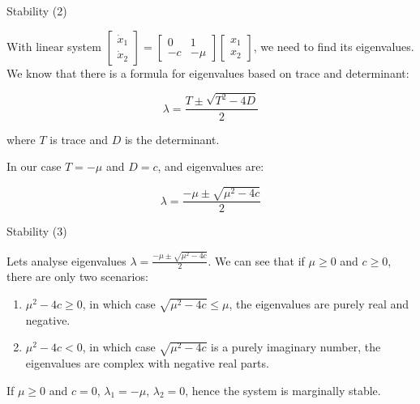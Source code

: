 \documentclass{beamer}
\begin{document}
\begin{frame}{Stability (2)}
\begin{flushleft}

With linear system 
$
    \begin{bmatrix}
    \dot x_1 \\ \dot x_2
    \end{bmatrix}
    =
    \begin{bmatrix}
    0 & 1 \\
    -c & -\mu
    \end{bmatrix} 
    \begin{bmatrix}
    x_1 \\ x_2
    \end{bmatrix}   
$, we need to find its eigenvalues. We know that there is a formula for eigenvalues based on trace and determinant:

\begin{equation}
    \lambda = \frac{T \pm \sqrt{T^2 - 4D} }{2}
\end{equation}

where $T$ is trace and $D$ is the determinant.

\bigskip

In our case $T = -\mu$ and $D = c$, and eigenvalues are:

\begin{equation}
    \lambda = \frac{-\mu \pm \sqrt{\mu^2 - 4c} }{2}
\end{equation}


\end{flushleft}
\end{frame}



\begin{frame}{Stability (3)}
\begin{flushleft}

Lets analyse eigenvalues $\lambda = \frac{-\mu \pm \sqrt{\mu^2 - 4c} }{2}$. We can see that if $\mu \geq 0$ and $c \geq 0$, there are only two scenarios: 

\begin{enumerate}
    \item $\mu^2 - 4c \geq 0$, in which case $\sqrt{\mu^2 - 4c} \leq \mu$, the eigenvalues are purely real and negative.
    \item $\mu^2 - 4c < 0$, in which case $\sqrt{\mu^2 - 4c}$ is a purely imaginary number, the eigenvalues are complex with negative real parts.
\end{enumerate}

If $\mu \geq 0$ and $c = 0$, $\lambda_1 = -\mu$, $\lambda_2 = 0$, hence the system is marginally stable.

\end{flushleft}
\end{frame}
\end{document}
